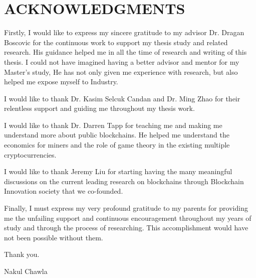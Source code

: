 \section*{ACKNOWLEDGMENTS}
Firstly, I would like to express my sincere gratitude to my advisor Dr. Dragan Boscovic for the continuous work to 
support my thesis study and related research. 
His guidance helped me in all the time of research and writing of this thesis. I could not have imagined having a 
better advisor and mentor for my Master's study, He has not only given me experience with research, but also helped me expose myself to Industry. 

I would like to thank Dr. Kasim Selcuk Candan and Dr. Ming Zhao for their relentless support and guiding me throughout my thesis work. 

I would like to thank Dr. Darren Tapp for teaching me and making me understand more about public blockchains. He helped me understand the economics for miners and the role of game theory in the existing multiple cryptocurrencies. 

I would like to thank Jeremy Liu for starting having the many meaningful discussions on the current leading research on blockchains through Blockchain Innovation society that we co-founded.

Finally, I must express my very profound gratitude to my parents for providing me the unfailing support and continuous encouragement throughout my years of study and through the process of researching. This accomplishment would have not been possible without them.

Thank you.


Nakul Chawla
